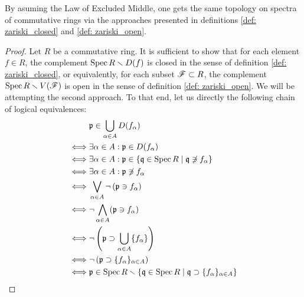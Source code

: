             \begin{proposition} \label{prop: zariski_topology_equivalence}
                By asuming the Law of Excluded Middle, one gets the same topology on spectra of commutative rings via the approaches presented in definitions \ref{def: zariski_closed} and \ref{def: zariski_open}.
            \end{proposition}
                \begin{proof}
                    Let $R$ be a commutative ring. It is sufficient to show that for each element $f \in R$, the complement $\Spec R \setminus D(f)$ is closed in the sense of definition \ref{def: zariski_closed}, or equivalently, for each subset $\scrF \subset R$, the complement $\Spec R \setminus V(\scrF)$ is open in the sense of definition \ref{def: zariski_open}. We will be attempting the second approach. To that end, let us directly the following chain of logical equivalences:
                        $$
                            \begin{aligned}
                                & \p \in \bigcup_{\alpha \in A} D(f_{\alpha})
                                \\
                                \iff & \exists \alpha \in A: \p \in D(f_{\alpha})
                                \\
                                \iff & \exists \alpha \in A: \p \in \{\q \in \Spec R \mid \q \not \ni f_{\alpha}\}
                                \\
                                \iff & \exists \alpha \in A: \p \not \ni f_{\alpha}
                                \\
                                \iff & \bigvee_{\alpha \in A} \neg\left(\p \ni f_{\alpha}\right)
                                \\
                                \iff & \neg \bigwedge_{\alpha \in A} (\p \ni f_{\alpha}) 
                                \\
                                \iff & \neg \left(\p \supset \bigcup_{\alpha \in A} \{f_{\alpha}\}\right)
                                \\
                                \iff & \neg \left(\p \supset \{f_{\alpha}\}_{\alpha \in A}\right)
                                \\
                                \iff & \p \in \Spec R \setminus \left\{\q \in \Spec R \mid \q \supset \{f_{\alpha}\}_{\alpha \in A}\right\}
                                \\

\end{aligned}$$
\end{proof}
